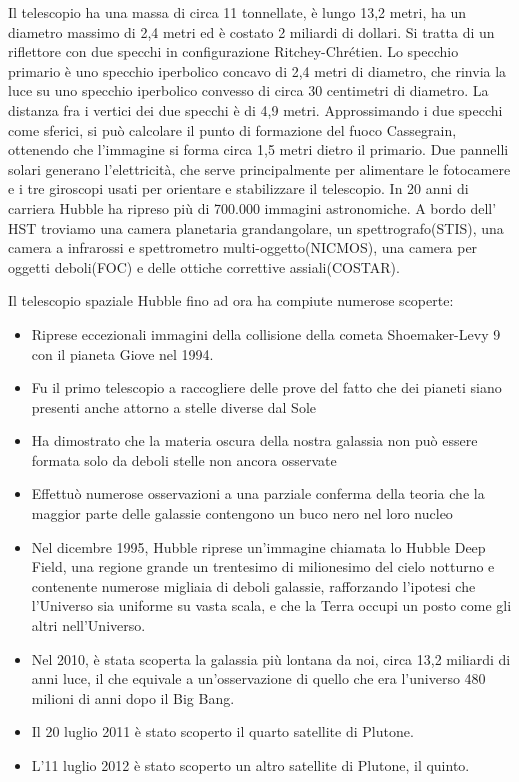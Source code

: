 \documentclass[12pt,a4paper]{article}
\begin{document}
Il telescopio ha una massa di circa 11 tonnellate, è lungo 13,2 metri, ha un diametro massimo di 2,4 metri ed è costato 2 miliardi di dollari. Si tratta di un riflettore con due specchi in configurazione Ritchey-Chrétien. Lo specchio primario è uno specchio iperbolico concavo di 2,4 metri di diametro, che rinvia la luce su uno specchio iperbolico convesso di circa 30 centimetri di diametro. La distanza fra i vertici dei due specchi è di 4,9 metri. Approssimando i due specchi come sferici, si può calcolare il punto di formazione del fuoco Cassegrain, ottenendo che l'immagine si forma circa 1,5 metri dietro il primario.
Due pannelli solari generano l'elettricità, che serve principalmente per alimentare le fotocamere e i tre giroscopi usati per orientare e stabilizzare il telescopio. In 20 anni di carriera Hubble ha ripreso più di 700.000 immagini astronomiche.
A bordo dell' HST troviamo una camera planetaria grandangolare, un spettrografo(STIS), una camera a infrarossi e spettrometro multi-oggetto(NICMOS), una camera per oggetti deboli(FOC) e delle ottiche correttive assiali(COSTAR).

Il telescopio spaziale Hubble fino ad ora ha compiute numerose scoperte:

\begin{itemize}
\item Riprese eccezionali immagini della collisione della cometa Shoemaker-Levy 9 con il pianeta Giove nel 1994.

\item Fu il primo telescopio a raccogliere delle prove del fatto che dei pianeti siano presenti anche attorno a stelle diverse dal Sole

\item Ha dimostrato che la materia oscura della nostra galassia non può essere formata solo da deboli stelle non ancora osservate

\item Effettuò numerose osservazioni a una parziale conferma della teoria che la maggior parte delle galassie contengono un buco nero nel loro nucleo

\item Nel dicembre 1995, Hubble riprese un'immagine chiamata lo Hubble Deep Field, una regione grande un trentesimo di milionesimo del cielo notturno e contenente numerose migliaia di deboli galassie, rafforzando l'ipotesi che l'Universo sia uniforme su vasta scala, e che la Terra occupi un posto come gli altri nell'Universo.

\item Nel 2010, è stata scoperta la galassia più lontana da noi, circa 13,2 miliardi di anni luce, il che equivale a un'osservazione di quello che era l'universo 480 milioni di anni dopo il Big Bang.

\item Il 20 luglio 2011 è stato scoperto il quarto satellite di Plutone.

\item L'11 luglio 2012 è stato scoperto un altro satellite di Plutone, il quinto.

\end{itemize}
\end{document}
